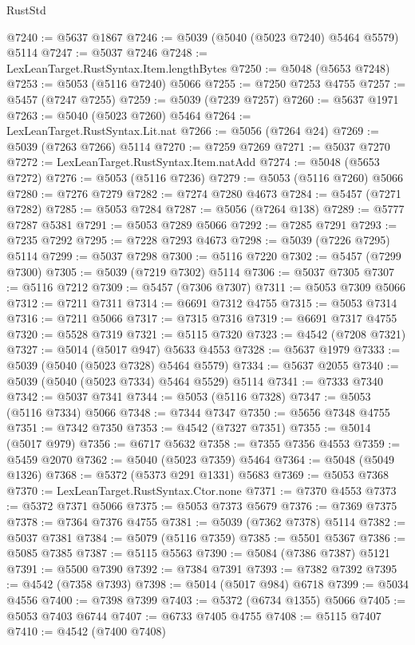 \begin{lexlean}{RustStd}
\begin{coremodule}
@7240 := @5637 @1867
@7246 := @5039 (@5040 (@5023 @7240) @5464 @5579) @5114
@7247 := @5037 @7246
@7248 := LexLeanTarget.RustSyntax.Item.lengthBytes
@7250 := @5048 (@5653 @7248)
@7253 := @5053 (@5116 @7240) @5066
@7255 := @7250 @7253 @4755
@7257 := @5457 (@7247 @7255)
@7259 := @5039 (@7239 @7257)
@7260 := @5637 @1971
@7263 := @5040 (@5023 @7260) @5464
@7264 := LexLeanTarget.RustSyntax.Lit.nat
@7266 := @5056 (@7264 @24)
@7269 := @5039 (@7263 @7266) @5114
@7270 := @7259 @7269
@7271 := @5037 @7270
@7272 := LexLeanTarget.RustSyntax.Item.natAdd
@7274 := @5048 (@5653 @7272)
@7276 := @5053 (@5116 @7236)
@7279 := @5053 (@5116 @7260) @5066
@7280 := @7276 @7279
@7282 := @7274 @7280 @4673
@7284 := @5457 (@7271 @7282)
@7285 := @5053 @7284
@7287 := @5056 (@7264 @138)
@7289 := @5777 @7287 @5381
@7291 := @5053 @7289 @5066
@7292 := @7285 @7291
@7293 := @7235 @7292
@7295 := @7228 @7293 @4673
@7298 := @5039 (@7226 @7295) @5114
@7299 := @5037 @7298
@7300 := @5116 @7220
@7302 := @5457 (@7299 @7300)
@7305 := @5039 (@7219 @7302) @5114
@7306 := @5037 @7305
@7307 := @5116 @7212
@7309 := @5457 (@7306 @7307)
@7311 := @5053 @7309 @5066
@7312 := @7211 @7311
@7314 := @6691 @7312 @4755
@7315 := @5053 @7314
@7316 := @7211 @5066
@7317 := @7315 @7316
@7319 := @6691 @7317 @4755
@7320 := @5528 @7319
@7321 := @5115 @7320
@7323 := @4542 (@7208 @7321)
@7327 := @5014 (@5017 @947) @5633 @4553
@7328 := @5637 @1979
@7333 := @5039 (@5040 (@5023 @7328) @5464 @5579)
@7334 := @5637 @2055
@7340 := @5039 (@5040 (@5023 @7334) @5464 @5529) @5114
@7341 := @7333 @7340
@7342 := @5037 @7341
@7344 := @5053 (@5116 @7328)
@7347 := @5053 (@5116 @7334) @5066
@7348 := @7344 @7347
@7350 := @5656 @7348 @4755
@7351 := @7342 @7350
@7353 := @4542 (@7327 @7351)
@7355 := @5014 (@5017 @979)
@7356 := @6717 @5632
@7358 := @7355 @7356 @4553
@7359 := @5459 @2070
@7362 := @5040 (@5023 @7359) @5464
@7364 := @5048 (@5049 @1326)
@7368 := @5372 (@5373 @291 @1331) @5683
@7369 := @5053 @7368
@7370 := LexLeanTarget.RustSyntax.Ctor.none
@7371 := @7370 @4553
@7373 := @5372 @7371 @5066
@7375 := @5053 @7373 @5679
@7376 := @7369 @7375
@7378 := @7364 @7376 @4755
@7381 := @5039 (@7362 @7378) @5114
@7382 := @5037 @7381
@7384 := @5079 (@5116 @7359)
@7385 := @5501 @5367
@7386 := @5085 @7385
@7387 := @5115 @5563
@7390 := @5084 (@7386 @7387) @5121
@7391 := @5500 @7390
@7392 := @7384 @7391
@7393 := @7382 @7392
@7395 := @4542 (@7358 @7393)
@7398 := @5014 (@5017 @984) @6718
@7399 := @5034 @4556
@7400 := @7398 @7399
@7403 := @5372 (@6734 @1355) @5066
@7405 := @5053 @7403 @6744
@7407 := @6733 @7405 @4755
@7408 := @5115 @7407
@7410 := @4542 (@7400 @7408)

\end{coremodule}
\end{lexlean}
